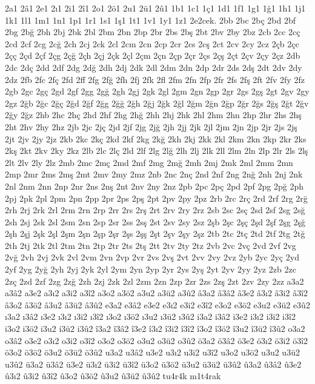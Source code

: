 2a1
2â1
2e1
2ı1
2i1
2î1
2o1
2ö1
2u1
2ü1
2û1
1b1
1c1
1ç1
1d1
1f1
1g1
1ğ1
1h1
1j1
1k1
1l1
1m1
1n1
1p1
1r1
1s1
1ş1
1t1
1v1
1y1
1z1
2e2cek.
2bb
2bc
2bç
2bd
2bf
2bg
2bğ
2bh
2bj
2bk
2bl
2bm
2bn
2bp
2br
2bs
2bş
2bt
2bv
2by
2bz
2cb
2cc
2cç
2cd
2cf
2cg
2cğ
2ch
2cj
2ck
2cl
2cm
2cn
2cp
2cr
2cs
2cş
2ct
2cv
2cy
2cz
2çb
2çc
2çç
2çd
2çf
2çg
2çğ
2çh
2çj
2çk
2çl
2çm
2çn
2çp
2çr
2çs
2çş
2çt
2çv
2çy
2çz
2db
2dc
2dç
2dd
2df
2dg
2dğ
2dh
2dj
2dk
2dl
2dm
2dn
2dp
2dr
2ds
2dş
2dt
2dv
2dy
2dz
2fb
2fc
2fç
2fd
2ff
2fg
2fğ
2fh
2fj
2fk
2fl
2fm
2fn
2fp
2fr
2fs
2fş
2ft
2fv
2fy
2fz
2gb
2gc
2gç
2gd
2gf
2gg
2gğ
2gh
2gj
2gk
2gl
2gm
2gn
2gp
2gr
2gs
2gş
2gt
2gv
2gy
2gz
2ğb
2ğc
2ğç
2ğd
2ğf
2ğg
2ğğ
2ğh
2ğj
2ğk
2ğl
2ğm
2ğn
2ğp
2ğr
2ğs
2ğş
2ğt
2ğv
2ğy
2ğz
2hb
2hc
2hç
2hd
2hf
2hg
2hğ
2hh
2hj
2hk
2hl
2hm
2hn
2hp
2hr
2hs
2hş
2ht
2hv
2hy
2hz
2jb
2jc
2jç
2jd
2jf
2jg
2jğ
2jh
2jj
2jk
2jl
2jm
2jn
2jp
2jr
2js
2jş
2jt
2jv
2jy
2jz
2kb
2kc
2kç
2kd
2kf
2kg
2kğ
2kh
2kj
2kk
2kl
2km
2kn
2kp
2kr
2ks
2kş
2kt
2kv
2ky
2kz
2lb
2lc
2lç
2ld
2lf
2lg
2lğ
2lh
2lj
2lk
2ll
2lm
2ln
2lp
2lr
2ls
2lş
2lt
2lv
2ly
2lz
2mb
2mc
2mç
2md
2mf
2mg
2mğ
2mh
2mj
2mk
2ml
2mm
2mn
2mp
2mr
2ms
2mş
2mt
2mv
2my
2mz
2nb
2nc
2nç
2nd
2nf
2ng
2nğ
2nh
2nj
2nk
2nl
2nm
2nn
2np
2nr
2ns
2nş
2nt
2nv
2ny
2nz
2pb
2pc
2pç
2pd
2pf
2pg
2pğ
2ph
2pj
2pk
2pl
2pm
2pn
2pp
2pr
2ps
2pş
2pt
2pv
2py
2pz
2rb
2rc
2rç
2rd
2rf
2rg
2rğ
2rh
2rj
2rk
2rl
2rm
2rn
2rp
2rr
2rs
2rş
2rt
2rv
2ry
2rz
2sb
2sc
2sç
2sd
2sf
2sg
2sğ
2sh
2sj
2sk
2sl
2sm
2sn
2sp
2sr
2ss
2sş
2st
2sv
2sy
2sz
2şb
2şc
2şç
2şd
2şf
2şg
2şğ
2şh
2şj
2şk
2şl
2şm
2şn
2şp
2şr
2şs
2şş
2şt
2şv
2şy
2şz
2tb
2tc
2tç
2td
2tf
2tg
2tğ
2th
2tj
2tk
2tl
2tm
2tn
2tp
2tr
2ts
2tş
2tt
2tv
2ty
2tz
2vb
2vc
2vç
2vd
2vf
2vg
2vğ
2vh
2vj
2vk
2vl
2vm
2vn
2vp
2vr
2vs
2vş
2vt
2vv
2vy
2vz
2yb
2yc
2yç
2yd
2yf
2yg
2yğ
2yh
2yj
2yk
2yl
2ym
2yn
2yp
2yr
2ys
2yş
2yt
2yv
2yy
2yz
2zb
2zc
2zç
2zd
2zf
2zg
2zğ
2zh
2zj
2zk
2zl
2zm
2zn
2zp
2zr
2zs
2zş
2zt
2zv
2zy
2zz
a3a2
a3â2
a3e2
a3ı2
a3i2
a3î2
a3o2
a3ö2
a3u2
a3ü2
a3û2
â3a2
â3â2
â3e2
â3ı2
â3i2
â3î2
â3o2
â3ö2
â3u2
â3ü2
â3û2
e3a2
e3â2
e3e2
e3ı2
e3i2
e3î2
e3o2
e3ö2
e3u2
e3ü2
e3û2
ı3a2
ı3â2
ı3e2
ı3ı2
ı3i2
ı3î2
ı3o2
ı3ö2
ı3u2
ı3ü2
ı3û2
i3a2
i3â2
i3e2
i3ı2
i3i2
i3î2
i3o2
i3ö2
i3u2
i3ü2
i3û2
î3a2
î3â2
î3e2
î3ı2
î3i2
î3î2
î3o2
î3ö2
î3u2
î3ü2
î3û2
o3a2
o3â2
o3e2
o3ı2
o3i2
o3î2
o3o2
o3ö2
o3u2
o3ü2
o3û2
ö3a2
ö3â2
ö3e2
ö3ı2
ö3i2
ö3î2
ö3o2
ö3ö2
ö3u2
ö3ü2
ö3û2
u3a2
u3â2
u3e2
u3ı2
u3i2
u3î2
u3o2
u3ö2
u3u2
u3ü2
u3û2
ü3a2
ü3â2
ü3e2
ü3ı2
ü3i2
ü3î2
ü3o2
ü3ö2
ü3u2
ü3ü2
ü3û2
û3a2
û3â2
û3e2
û3ı2
û3i2
û3î2
û3o2
û3ö2
û3u2
û3ü2
û3û2
tu4r4k
m1t4rak